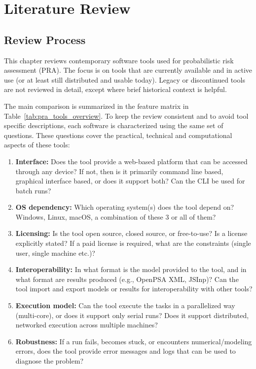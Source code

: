 \chapter{Literature Review}
\label{chap:literature-review}

\section{Review Process}
\label{sec:lr-pra-tools-related}

This chapter reviews contemporary software tools used for probabilistic risk assessment (PRA). The focus is on tools that are currently available and in active use (or at least still distributed and usable today). Legacy or discontinued tools are not reviewed in detail, except where brief historical context is helpful.

The main comparison is summarized in the feature matrix in Table~\ref{tab:pra_tools_overview}. To keep the review consistent and to avoid tool specific descriptions, each software is characterized using the same set of questions. These questions cover the practical, technical and computational aspects of these tools:

\begin{enumerate}
  \item \textbf{Interface:} Does the tool provide a web-based platform that can be accessed through any device? If not, then is it primarily command line based, graphical interface based, or does it support both? Can the CLI be used for batch runs?

  \item \textbf{OS dependency:} Which operating system(s) does the tool depend on? Windows, Linux, macOS, a combination of these 3 or all of them?

  \item \textbf{Licensing:} Is the tool open source, closed source, or free-to-use? Is a license explicitly stated? If a paid license is required, what are the constraints (single user, single machine etc.)?

  \item \textbf{Interoperability:} In what format is the model provided to the tool, and in what format are results produced (e.g., OpenPSA XML, JSInp)? Can the tool import and export models or results for interoperability with other tools?

  \item \textbf{Execution model:} Can the tool execute the tasks in a parallelized way (multi-core), or does it support only serial runs? Does it support distributed, networked execution across multiple machines?

  \item \textbf{Robustness:} If a run fails, becomes stuck, or encounters numerical/modeling errors, does the tool provide error messages and logs that can be used to diagnose the problem?
\end{enumerate}

